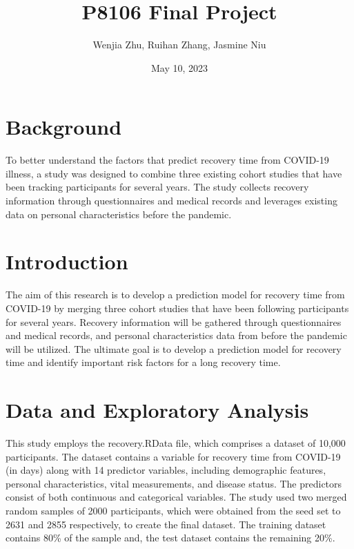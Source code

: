\documentclass[
]{article}
\title{P8106 Final Project}
\author{Wenjia Zhu, Ruihan Zhang, Jasmine Niu}
\date{May 10, 2023}
\begin{document}
\maketitle

{
\setcounter{tocdepth}{2}
\tableofcontents
}
\newpage

\hypertarget{background}{%
\section{Background}\label{background}}

To better understand the factors that predict recovery time from
COVID-19 illness, a study was designed to combine three existing cohort
studies that have been tracking participants for several years. The
study collects recovery information through questionnaires and medical
records and leverages existing data on personal characteristics before
the pandemic.

\hypertarget{introduction}{%
\section{Introduction}\label{introduction}}

The aim of this research is to develop a prediction model for recovery
time from COVID-19 by merging three cohort studies that have been
following participants for several years. Recovery information will be
gathered through questionnaires and medical records, and personal
characteristics data from before the pandemic will be utilized. The
ultimate goal is to develop a prediction model for recovery time and
identify important risk factors for a long recovery time.

\hypertarget{data-and-exploratory-analysis}{%
\section{Data and Exploratory
Analysis}\label{data-and-exploratory-analysis}}

This study employs the recovery.RData file, which comprises a dataset of
10,000 participants. The dataset contains a variable for recovery time
from COVID-19 (in days) along with 14 predictor variables, including
demographic features, personal characteristics, vital measurements, and
disease status. The predictors consist of both continuous and
categorical variables. The study used two merged random samples of 2000
participants, which were obtained from the seed set to 2631 and 2855
respectively, to create the final dataset. The training dataset contains
80\% of the sample and, the test dataset contains the remaining 20\%.
\end{document}
